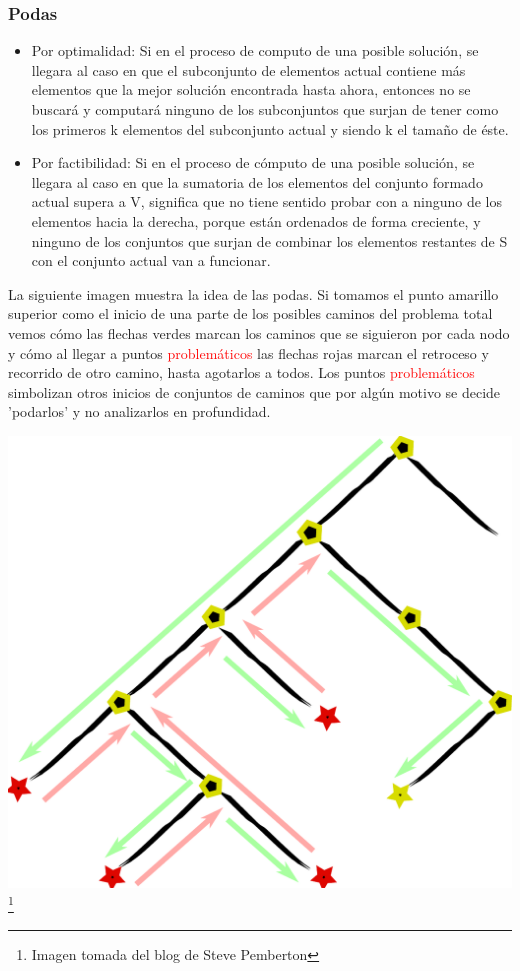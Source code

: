 \documentclass[8pt,a4paper]{article}
\begin{document}
\subsubsection{Podas}
\begin{itemize}
	\item 
	Por optimalidad: Si en el proceso de computo de una posible solución, se llegara al caso en que el subconjunto de elementos actual contiene más elementos que la mejor solución encontrada hasta ahora, entonces no se buscará y computará ninguno de los subconjuntos que surjan de tener como los primeros k elementos del subconjunto actual y siendo k el tamaño de éste.
	\item 
	Por factibilidad: Si en el proceso de cómputo de una posible solución, se llegara al caso en que la sumatoria de los elementos del conjunto formado actual supera a V, significa que no tiene sentido probar con a ninguno de los elementos hacia la derecha, porque están ordenados de forma creciente, y ninguno de los conjuntos que surjan de combinar los elementos restantes de S con el conjunto actual van a funcionar.
\end{itemize}


La siguiente imagen muestra la idea de las podas. Si tomamos el punto amarillo superior como el inicio de una parte de los posibles caminos del problema total vemos cómo las flechas verdes marcan los caminos que se siguieron por cada nodo y cómo al llegar a puntos \textcolor{red}{problemáticos} las flechas rojas marcan el retroceso y recorrido de otro camino, hasta agotarlos a todos. Los puntos \textcolor{red}{problemáticos} simbolizan otros inicios de conjuntos de caminos que por algún motivo se decide 'podarlos' y no analizarlos en profundidad.

\begin{center}
\includegraphics[scale=.2]{backtrack}
\footnote{Imagen tomada del blog de Steve Pemberton}
\end{center}
\end{document}
